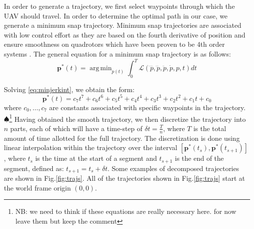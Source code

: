 \documentclass[letterpaper, 10 pt, conference]{ieeeconf}  %
\newcommand\NB[1]{$\spadesuit$\footnote{NB: #1}}
\DeclareMathOperator*{\argmin}{arg\,min}
\begin{document}

In order to generate a trajectory, we first select waypoints through which the UAV should travel. In order to determine the optimal path in our case, we generate a minimum snap trajectory. Minimum snap trajectories are associated with low control effort as they are based on the fourth derivative of position and ensure smoothness on quadrotors which have been proven to be 4th order systems \cite{minsnap}. The general equation for a minimum snap trajectory is as follows:
\begin{equation} \label{eq:minjerkint}
    \mathbf{p}^*(t) = \argmin_{p(t)}\int_0^T\mathcal{L}(\ddddot{p},\dddot{p},\ddot{p},\dot{p},p,t)dt
\end{equation}

Solving \eqref{eq:minjerkint}, we obtain the form:
\begin{equation}
    \mathbf{p}^*(t) = c_7t^7 + c_6t^6 + c_5t^5 + c_4t^4 + c_3t^3 + c_2t^2 + c_1t + c_0 
\end{equation}
where $c_0,\ldots,c_7$ are constants associated with specific waypoints in the trajectory.
\NB{we need to think if these equations are really necessary here. for now leave them but keep the comment}
Having obtained the smooth trajectory, we then discretize the trajectory into $n$ parts, each of which will have a time-step of $\delta t = \frac{T}{n}$, where $T$ is the total amount of time allotted for the full trajectory. The discretization is done using linear interpolation within the trajectory over the interval $[\mathbf{p}^*(t_s), \mathbf{p}^*(t_{s+1})]$, where $t_s$ is the time at the start of a segment and $t_{s+1}$ is the end of the segment, defined as: $t_{s+1} = t_s + \delta t$. 
Some examples of decomposed trajectories are shown in Fig.\ref{fig:trajs}. All of the trajectories shown in Fig.\ref{fig:trajs} start at the world frame origin $(0,0)$.
\end{document}
